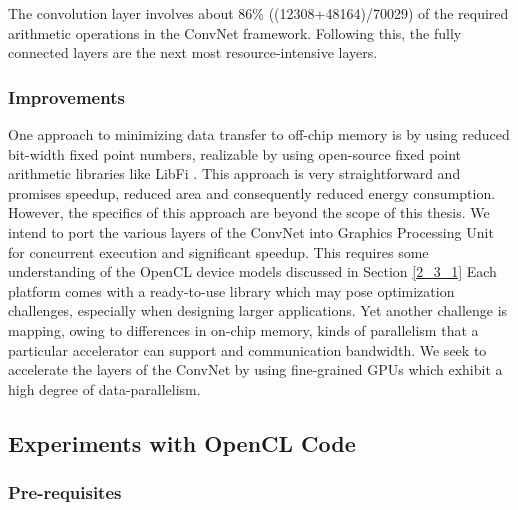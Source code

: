 The convolution layer involves about 86\% ((12308+48164)/70029) of the required arithmetic operations in the ConvNet framework. Following this, the fully connected layers are the next most resource-intensive layers. 
\subsubsection{Improvements}
\label{3_1_2_3}
One approach to minimizing data transfer to off-chip memory is by using reduced bit-width fixed point numbers, realizable by using open-source fixed point arithmetic libraries like LibFi \cite{LibFi}. This approach is very straightforward and promises speedup, reduced area and consequently reduced energy consumption. However, the specifics of this approach are beyond the scope of this thesis. \newline \newline
We intend to port the various layers of the ConvNet into Graphics Processing Unit for concurrent execution and significant speedup. This requires some understanding of the OpenCL device models discussed in Section \ref{2_3_1}
Each platform comes with a ready-to-use library which may pose optimization challenges, especially when designing larger applications.  Yet another challenge is mapping, owing to differences in on-chip memory, kinds of parallelism that a particular accelerator can support and communication bandwidth. We seek to accelerate the layers of the ConvNet by using fine-grained GPUs which exhibit a high degree of data-parallelism.
\subsection{Experiments with OpenCL Code}
\label{3_1_3}
\subsubsection{Pre-requisites}
\label{3_1_3_1}
